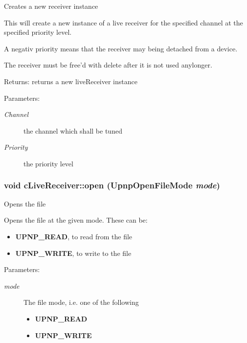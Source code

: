 Creates a new receiver instance

This will create a new instance of a live receiver for the specified channel at the specified priority level.

A negativ priority means that the receiver may being detached from a device.

The receiver must be free'd with delete after it is not used anylonger.

\begin{Desc}
\item[Returns:]returns a new liveReceiver instance \end{Desc}
\begin{Desc}
\item[Parameters:]
\begin{description}
\item[{\em Channel}]the channel which shall be tuned \item[{\em Priority}]the priority level \end{description}
\end{Desc}
\hypertarget{classcLiveReceiver_b8e751f641be1da4a925106e3dd062e9}{
\subsubsection[{open}]{\setlength{\rightskip}{0pt plus 5cm}void cLiveReceiver::open (UpnpOpenFileMode {\em mode})}}
\label{classcLiveReceiver_b8e751f641be1da4a925106e3dd062e9}


Opens the file

Opens the file at the given mode. These can be:\begin{itemize}
\item {\bf UPNP\_\-READ}, to read from the file\item {\bf UPNP\_\-WRITE}, to write to the file\end{itemize}


\begin{Desc}
\item[Parameters:]
\begin{description}
\item[{\em mode}]The file mode, i.e. one of the following\begin{itemize}
\item {\bf UPNP\_\-READ} \item {\bf UPNP\_\-WRITE} \end{itemize}
\end{description}
\end{Desc}
 

